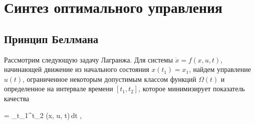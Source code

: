 \chapter{Синтез оптимального управления}
\newcommand{\funcF}{ \calf{F}           } %
\newcommand{\optF}{  \optimum{\funcF}   } %
\newcommand{\optU}{  \optimum{u}        } %
\newcommand{\optX}{  \optimum{x}        } %
\newcommand{\funcL}{ \sff{L}            } %
\newcommand{\funcT}{ \optimum{\sff{F}}  } %
\newcommand{\funcH}{ \optimum{H}        } %

\newcommand{\mA}{    \bff{A}            } %
\newcommand{\mB}{    \bff{B}            } %
\newcommand{\mM}{    \bff{M}            } %
\newcommand{\mQ}{    \bff{Q}            } %
\newcommand{\mR}{    \bff{R}            } %
\newcommand{\mP}{    \bff{P}            } %
\newcommand{\mH}{    \bff{H}            } %
\newcommand{\mD}{    \bff{D}            } %
\newcommand{\mC}{    \bff{C}            } %
\newcommand{\mLa}{   \bff{\Lambda}      } %
\newcommand{\mI}{    \bff{I}            } %
\newcommand{\mb}{    \bff{b}            } %
\newcommand{\mk}{    \bff{k}            } %




\section{Принцип Беллмана}



Рассмотрим следующую задачу Лагранжа. Для системы $\dot{x} = f(x, u, t)$, начинающей движение из начального состояния $x(t_1) = x_1$, найдем управление $u(t)$, ограниченное некоторым допустимым классом функций $\Omega(t)$ и определенное на интервале времени $[t_1, t_2]$, которое минимизирует показатель качества

    \funcF = \int\limits_{t_1}^{t_2} \funcL(x, u, t)\,dt \mbox{,}
\eeq

